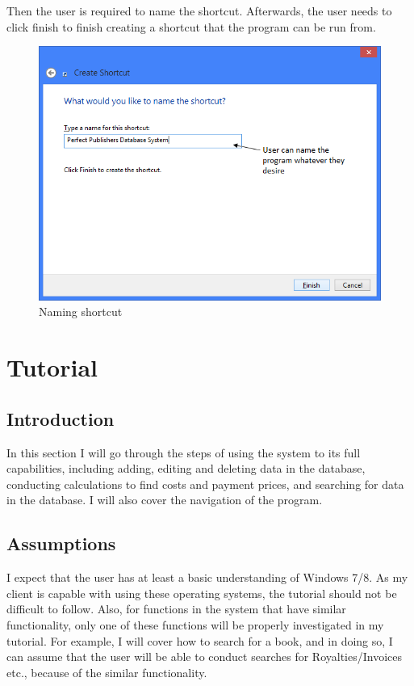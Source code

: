 Then the user is required to name the shortcut. Afterwards, the user needs to click finish to finish creating a shortcut that the program can be run from.

\begin{figure}[H]
    \includegraphics[width=\textwidth]{./Manual/Installation/NameShortcut.png}
    \caption{Naming shortcut}
\end{figure}

\section{Tutorial}

\subsection{Introduction}

In this section I will go through the steps of using the system to its full capabilities, including adding, editing and deleting data in the database, conducting calculations to find costs and payment prices, and searching for data in the database. I will also cover the navigation of the program.

\subsection{Assumptions}

I expect that the user has at least a basic understanding of Windows 7/8. As my client is capable with using these operating systems, the tutorial should not be difficult to follow. Also, for functions in the system that have similar functionality, only one of these functions will be properly investigated in my tutorial. For example, I will cover how to search for a book, and in doing so, I can assume that the user will be able to conduct searches for Royalties/Invoices etc., because of the similar functionality.

